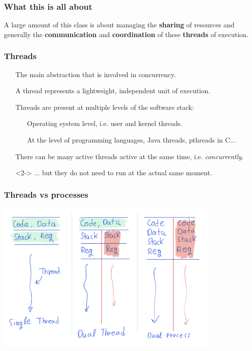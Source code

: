 \documentclass[xcolor={dvipsnames,svgnames},aspectratio=169]{beamer}
\begin{document}
\begin{frame}[fragile]
  \frametitle{What this is all about}

  \large{A large amount of this class is about managing the \textbf{sharing} of resources
  and generally the \textbf{communication} and \textbf{coordination} of these
  \textbf{threads} of execution. }
\end{frame}

\begin{frame}[fragile]
  \frametitle{Threads}

  \begin{itemize}
  \item[\faBook] The main abstraction that is involved in concurrency.
  \item[\faBook] A thread represents a lightweight, independent unit of
    execution.
  \item[\faBook] Threads are present at multiple levels of the
    software stack:
    \begin{itemize}
    \item[\faLinux] Operating system level, i.e. user and kernel threads.
    \item[\faCode] At the level of programming languages, Java threads, pthreads
      in C...
    \end{itemize}
  \item[\faBook] There can be many active threads active at the same time, i.e.
    \emph{concurrently}.
  \item[\faExclamation]<2-> ... but they do not need to run at the actual same moment.
  \end{itemize}
\end{frame}

\begin{frame}[fragile]
  \frametitle{Threads vs processes}

  \begin{center}
    \includegraphics[width=11cm,keepaspectratio]{../media/lecture1-threads.png}
  \end{center}
\end{frame}
\end{document}
